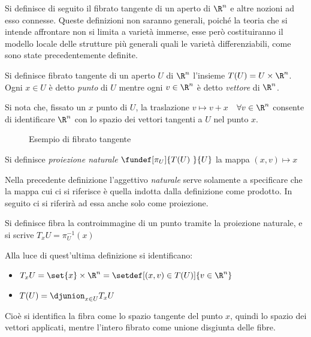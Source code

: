 

Si definisce di seguito il fibrato tangente di un aperto di $\R ^n$ e altre nozioni ad esso connesse.
Queste definizioni non saranno generali, poiché la teoria che si intende affrontare non si limita a varietà immerse, esse però costituiranno il modello locale delle strutture più generali quali le varietà differenziabili, come sono state precedentemente definite.

\begin{defn}
Si definisce fibrato tangente di un aperto $U$ di $\R ^n$ l'insieme $T(U) = U \times \R ^n$. Ogni $x\in U$ è detto \emph{punto} di $U$ mentre ogni $v\in \R ^n$ è detto \emph{vettore} di $\R ^n$.
\end{defn}

Si nota che, fissato un $x$ punto di $U$, la traslazione $v \mapsto v + x$~~$\forall v\in \R ^n$  consente di identificare $\R ^n$ con lo spazio dei vettori tangenti a $U$ nel punto $x$.

\begin{figure}[b]
\centering

\caption{Esempio di fibrato tangente}
\end{figure}


\begin{defn}
Si definisce \emph{proiezione naturale} $\fundef[\pi _U]{T(U)~}{U}$ la mappa $(x,v) \mapsto x$
\end{defn}

Nella precedente definizione l'aggettivo \emph{naturale} serve solamente a specificare che la mappa cui ci si riferisce è quella indotta dalla definizione come prodotto. In seguito ci si riferirà ad essa anche solo come proiezione.

\begin{defn}[Fibra]
Si definisce fibra la controimmagine di un punto tramite la proiezione naturale, e si scrive $T_x U = \pi ^{-1} _U (x)$
\end{defn}

Alla luce di quest'ultima definizione si identificano:
\begin{itemize}
\item $T_x U = \set{x} \times \R ^n = \setdef[(x,v)\in T(U)]{v \in \R^n}$
\item $T(U) = \djunion_{x \in U} T_x U$
\end{itemize}
Cioè si identifica la fibra come lo spazio tangente del punto $x$, quindi lo spazio dei vettori applicati, mentre l'intero fibrato come unione disgiunta delle fibre.

